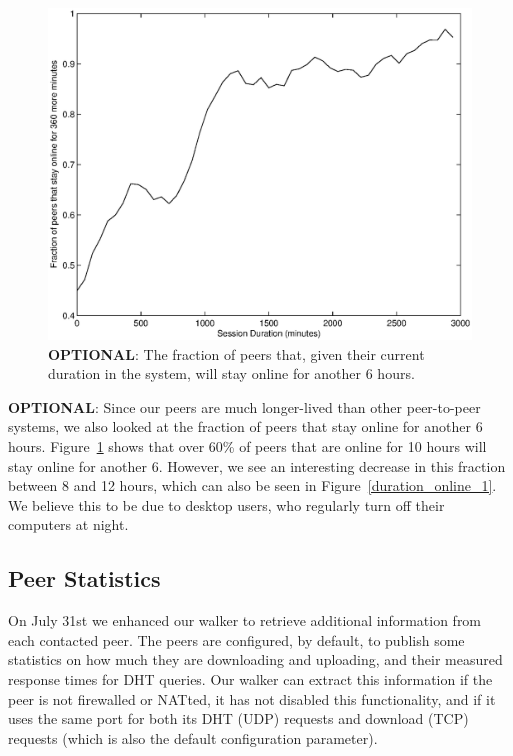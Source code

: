 \documentclass[conference]{IEEEtran}
\begin{document}
\begin{figure}
\centering
\includegraphics[width=\columnwidth]{AptP2PDuration-online_6.eps}
\caption{\textbf{OPTIONAL}: The fraction of peers that, given their current duration in
the system, will stay online for another 6 hours.}
\label{duration_online_6}
\end{figure}

\textbf{OPTIONAL}: Since our peers are much longer-lived than other peer-to-peer systems, we
also looked at the fraction of peers that stay online for another 6
hours. Figure~\ref{duration_online_6} shows that over 60\% of peers
that are online for 10 hours will stay online for another 6.
However, we see an interesting decrease in this fraction between 8
and 12 hours, which can also be seen in
Figure~\ref{duration_online_1}. We believe this to be due to desktop
users, who regularly turn off their computers at night.

\subsection{Peer Statistics}
\label{peer_stats}

On July 31st we enhanced our walker to retrieve additional
information from each contacted peer. The peers are configured, by
default, to publish some statistics on how much they are downloading
and uploading, and their measured response times for DHT queries.
Our walker can extract this information if the peer is not
firewalled or NATted, it has not disabled this functionality, and if
it uses the same port for both its DHT (UDP) requests and download
(TCP) requests (which is also the default configuration parameter).
\end{document}
